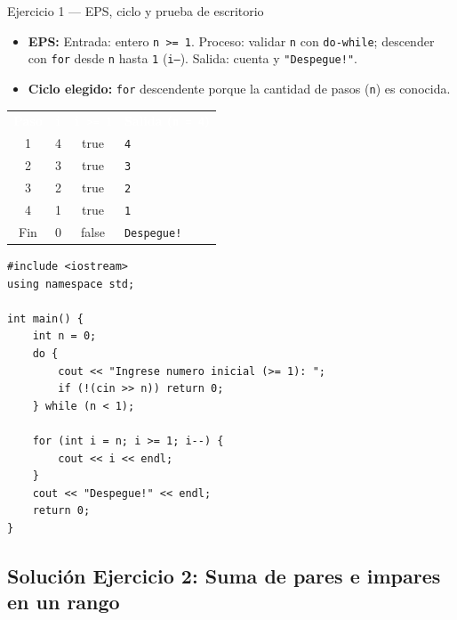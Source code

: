 \documentclass[11pt,letterpaper]{article}
\begin{document}
\begin{solucion}{Ejercicio 1 --- EPS, ciclo y prueba de escritorio}
\begin{itemize}
  \item \textbf{EPS:} Entrada: entero \texttt{n >= 1}. Proceso: validar \texttt{n} con \texttt{do-while}; descender con \texttt{for} desde \texttt{n} hasta \texttt{1} (\texttt{i--}). Salida: cuenta y \texttt{"Despegue!"}.
  \item \textbf{Ciclo elegido:} \texttt{for} descendente porque la cantidad de pasos (\texttt{n}) es conocida.
\end{itemize}
\begin{center}
\footnotesize
\renewcommand{\arraystretch}{1.15}
\begin{tabularx}{0.85\linewidth}{c c c X}
\rowcolor{AzulMarino}
\textcolor{white}{\textbf{Paso}} & \textcolor{white}{\texttt{i}} & \textcolor{white}{\texttt{i >= 1}} & \textcolor{white}{\textbf{Salida (\texttt{n = 4})}} \\
1 & 4 & true & \texttt{4} \\
2 & 3 & true & \texttt{3} \\
3 & 2 & true & \texttt{2} \\
4 & 1 & true & \texttt{1} \\
Fin & 0 & false & \texttt{Despegue!} \\
\bottomrule
\end{tabularx}
\end{center}
\end{solucion}

\begin{lstlisting}[style=cppmonitoria,caption={Solución Ejercicio 1: Cuenta regresiva (C++)}]
#include <iostream>
using namespace std;

int main() {
    int n = 0;
    do {
        cout << "Ingrese numero inicial (>= 1): ";
        if (!(cin >> n)) return 0;
    } while (n < 1);

    for (int i = n; i >= 1; i--) {
        cout << i << endl;
    }
    cout << "Despegue!" << endl;
    return 0;
}
\end{lstlisting}

\subsection{Solución Ejercicio 2: Suma de pares e impares en un rango}
\end{document}
